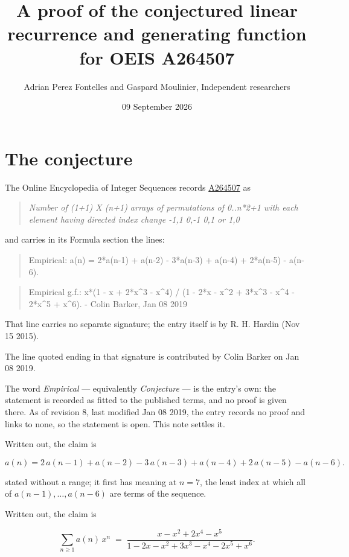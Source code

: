 \documentclass[11pt]{article}
\title{A proof of the conjectured linear recurrence and generating function for OEIS A264507}
\author{Adrian Perez Fontelles and Gaspard Moulinier, Independent researchers}
\date{09 September 2026}
\theoremstyle{definition}
\begin{document}
\maketitle
\section{The conjecture}

The Online Encyclopedia of Integer Sequences records \href{https://oeis.org/A264507}{A264507} as

\begin{quote}\itshape Number of (1+1) X (n+1) arrays of permutations of 0..n*2+1 with each element having directed index change -1,1 0,-1 0,1 or 1,0\end{quote}

and carries in its Formula section the lines:

\begin{quote}\ttfamily Empirical: a(n) = 2*a(n-1) + a(n-2) - 3*a(n-3) + a(n-4) + 2*a(n-5) - a(n-6).\end{quote}

\begin{quote}\ttfamily Empirical g.f.: x*(1 - x + 2*x\textasciicircum{}3 - x\textasciicircum{}4) / (1 - 2*x - x\textasciicircum{}2 + 3*x\textasciicircum{}3 - x\textasciicircum{}4 - 2*x\textasciicircum{}5 + x\textasciicircum{}6). - Colin Barker, Jan 08 2019\end{quote}

That line carries no separate signature; the entry itself is by R. H. Hardin (Nov 15 2015).

The line quoted ending in that signature is contributed by Colin Barker on Jan 08 2019.

The word {\itshape Empirical} --- equivalently {\itshape Conjecture} --- is the entry's own: the statement is recorded as fitted to the published terms, and no proof is given there. As of revision 8, last modified Jan 08 2019, the entry records no proof and links to none, so the statement is open. This note settles it.

Written out, the claim is

\[a(n) = 2\,a(n-1) + a(n-2) - 3\,a(n-3) + a(n-4) + 2\,a(n-5) - a(n-6).\]

stated without a range; it first has meaning at $n = 7$, the least index at which all of $a(n-1),\dots,a(n-6)$ are terms of the sequence.

Written out, the claim is

\[\sum_{n \ge 1} a(n)\,x^n \;=\; \frac{x - x^{2} + 2x^{4} - x^{5}}{1 - 2x - x^{2} + 3x^{3} - x^{4} - 2x^{5} + x^{6}}.\]
\end{document}
